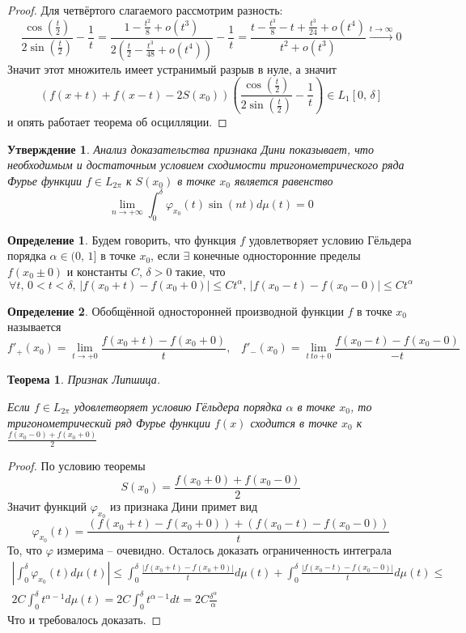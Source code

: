 \documentclass[a4paper,12pt]{article}
\renewcommand{\phi}{\ensuremath{\varphi}}
\renewcommand{\leq}{\ensuremath{\leqslant}}
\theoremstyle{plain}
\newtheorem{theorem}{Теорема}[section]
\newtheorem{proposition}{Утверждение}[section]
\theoremstyle{definition}
\newtheorem{definition}{Определение}[section]
\theoremstyle{remark}
\begin{document}
\begin{proof}
	Для четвёртого слагаемого рассмотрим разность:
	\[\frac{\cos(\frac{t}{2})}{2\sin(\frac{t}{2})} - \frac{1}{t} = \frac{1 - \frac{t^2}{8} + o(t^3)}{2\left(\frac{t}{2} - \frac{t^3}{48} + o(t^4)\right)} - \frac{1}{t} = \frac{t - \frac{t^3}{8} - t + \frac{t^3}{24} + o(t^4)}{t^2 + o(t^3)} \stackrel{t \to \infty}{\to} 0\]
	Значит этот множитель имеет устранимый разрыв в нуле, а значит
	\[(f(x + t) + f(x - t) - 2S(x_0))\left(\frac{\cos(\frac{t}{2})}{2\sin(\frac{t}{2})} - \frac{1}{t}\right) \in L_1[0,\,\delta]\]
	и опять работает теорема об осцилляции.
\end{proof}

\begin{proposition}
	\label{DINI_NOTE}
	Анализ доказательства признака Дини показывает, что необходимым и достаточным условием сходимости тригонометрического ряда Фурье функции $f \in L_{2\pi}$ к $S(x_0)$ в точке $x_0$ является равенство
	\[\lim_{n \to +\infty} \int_0^\delta \phi_{x_0}(t)\sin(nt)d\mu(t) = 0\]
\end{proposition}

\begin{definition}
	Будем говорить, что функция $f$ удовлетворяет условию Гёльдера порядка $\alpha \in (0,\,1]$ в точке $x_0$, если $\exists$ конечные односторонние пределы $f(x_0 \pm 0)$ и константы $C,\, \delta > 0$ такие, что
	\[
		\forall t,\, 0 < t < \delta,\, |f(x_0 + t) - f(x_0 + 0)| \leq Ct^\alpha,\, |f(x_0 - t) - f(x_0 - 0)| \leq Ct^\alpha
	\]
\end{definition}

\begin{definition}
	Обобщённой односторонней производной функции $f$ в точке $x_0$ называется
	\[f'_+(x_0) = \lim_{t \to +0} \frac{f(x_0 + t) - f(x_0 + 0)}{t},\;\;\; f'_-(x_0) = \lim_{t \ to +0} \frac{f(x_0 - t) - f(x_0 - 0)}{-t}\]
\end{definition}

\begin{theorem}
	Признак Липшица.

	Если $f \in L_{2\pi}$ удовлетворяет условию Гёльдера порядка $\alpha$ в точке $x_0$, то тригонометрический ряд Фурье функции $f(x)$ сходится в точке $x_0$ к $\frac{f(x_0 - 0) + f(x_0 + 0)}{2}$
\end{theorem}

\begin{proof}
	По условию теоремы
	\[S(x_0) = \frac{f(x_0 + 0) + f(x_0 - 0)}{2}\]
	Значит функций $\phi_{x_0}$ из признака Дини примет вид
	\[\phi_{x_0}(t) = \frac{(f(x_0 + t) - f(x_0 + 0)) + (f(x_0 - t) - f(x_0 - 0))}{t}\]
	То, что $\phi$ измерима -- очевидно. Осталось доказать ограниченность интеграла
	\begin{align*}
		\left|\int_0^\delta \phi_{x_0}(t)d\mu(t)\right| \leq \int_0^\delta \frac{|f(x_0 + t) - f(x_0 + 0)|}{t}d\mu(t) + \int_0^\delta \frac{|f(x_0 - t) - f(x_0 - 0)|}{t}d\mu(t) \leq \\
		2C\int_0^\delta t^{\alpha - 1}d\mu(t) = 2C \int_0^\delta t^{\alpha - 1}dt = 2C\frac{\delta^\alpha}{\alpha}
	\end{align*}
	Что и требовалось доказать.
\end{proof}
\end{document}
